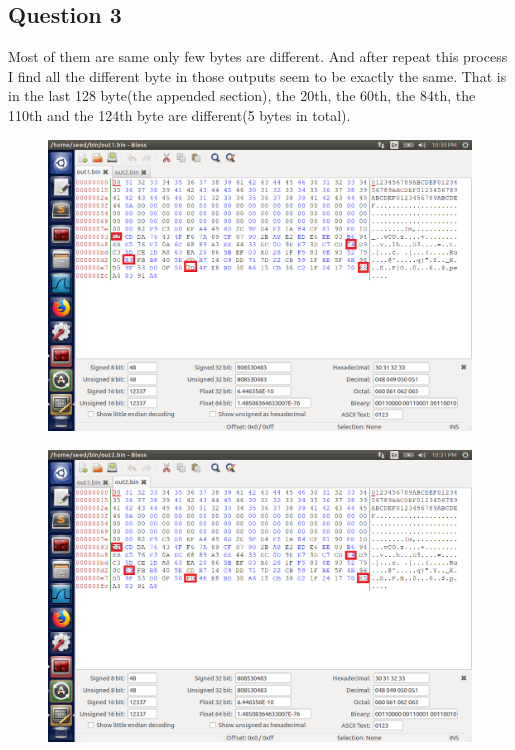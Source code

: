 \documentclass{article}
\begin{document}
\subsection{Question 3}
Most of them are same only few bytes are different. And after repeat this process I find all the different byte in those outputs seem to be exactly the same. That is in the last 128 byte(the appended section), the 20th, the 60th, the 84th, the 110th and the 124th byte are different(5 bytes in total).
\begin{figure}[H]\centering\includegraphics[width=\textwidth]{ss/06.png}\end{figure}
\begin{figure}[H]\centering\includegraphics[width=\textwidth]{ss/07.png}\end{figure}
\end{document}
